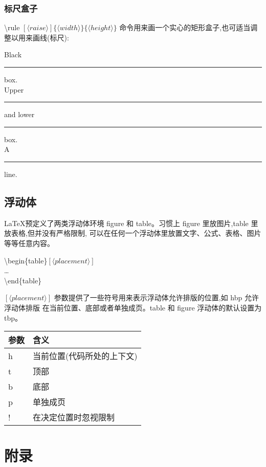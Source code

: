 \documentclass[a4paper]{ctexart}
\begin{document}
    \subsubsection{标尺盒子}
    \textbackslash rule $[\langle raise\rangle]\{\langle width\rangle\}\{\langle height\rangle\}$%
    命令用来画一个实心的矩形盒子,也可适当调整以用来画线(标尺):\par
    Black \rule{12pt}{4pt} box.\\
    Upper \rule[4pt]{6pt}{8pt} and lower \rule[-4pt]{6pt}{8pt} box.\\
    A \rule[-.4pt]{6pt}{.4pt} line.\par
    \subsection{浮动体}
    \LaTeX 预定义了两类浮动体环境 figure 和 table。习惯上 figure 里放图片,table 里放表格,但并没有严格限制,%
    可以在任何一个浮动体里放置文字、公式、表格、图片等等任意内容。\par
    \textbackslash begin\{table\}$[\langle placement\rangle]$\\
    \ldots\\
    \textbackslash end\{table\}\par
    $[\langle placement\rangle]$ 参数提供了一些符号用来表示浮动体允许排版的位置,如 hbp 允许浮动体排版
    在当前位置、底部或者单独成页。table 和 figure 浮动体的默认设置为 tbp。\par
    \begin{tabular}{ll}
        \toprule
        参数     & 含义\\
        \midrule
        h       & 当前位置(代码所处的上下文)\\
        t       & 顶部\\
        b       & 底部\\ 
        p       & 单独成页\\ 
        !       & 在决定位置时忽视限制\\
        \bottomrule
    \end{tabular}\par
    
    \appendix
    \section{附录}
\end{document}
